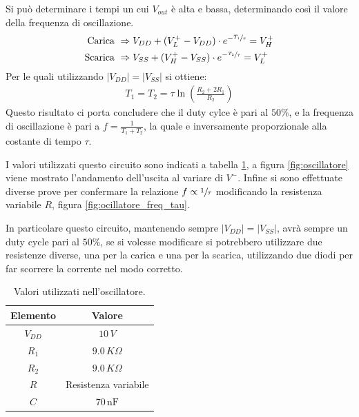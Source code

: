 \documentclass[a4paper,12pt]{article}
\begin{document}
Si può determinare i tempi un cui $V_{out}$ è alta e bassa, determinando così il valore della frequenza di oscillazione.
\begin{align*}
	\text{Carica}\,\,  & \Rightarrow V_{DD} + (V^+_L - V_{DD}) \cdot e^{-\sfrac{T_1}{\tau}} = V^+_H \\
	\text{Scarica}\,\, & \Rightarrow V_{SS} + (V^+_H - V_{SS}) \cdot e^{-\sfrac{T_2}{\tau}} = V^+_L
\end{align*}
Per le quali utilizzando $\left| V_{DD} \right| = \left| V_{SS} \right|$ si ottiene:
\begin{align*}
	T_1 = T_2 = \tau \ln\left( \frac{R_2 + 2R_1}{R_2} \right)
\end{align*}
Questo risultato ci porta concludere che il duty cylce è pari al $50\%$, e la frequenza di oscillazione è pari a $ f = \frac{1}{T_1 + T_2}$, la quale e inversamente proporzionale alla costante di tempo $\tau$.

\noindent I valori utilizzati questo circuito sono indicati a tabella \ref{tab:oscillatore}, a figura \ref{fig:oscillatore} viene mostrato l'andamento dell'uscita al variare di $V^-$. Infine si sono effettuate diverse prove per confermare la relazione $f \propto \sfrac{1}{\tau}$ modificando la resistenza variabile $R$, figura \ref{fig:ocillatore_freq_tau}.

\noindent In particolare questo circuito, mantenendo sempre $\left| V_{DD} \right| = \left| V_{SS} \right|$, avrà sempre un duty cycle pari al $50\%$, se si volesse modificare si potrebbero utilizzare due resistenze diverse, una per la carica e una per la scarica, utilizzando due diodi per far scorrere la corrente nel modo corretto.
\begin{table}[h]
	\centering
	\setlength{\tabcolsep}{20pt}
	\begin{tabular}{c c}
		\toprule
		Elemento & Valore               \\
		\midrule
		$V_{DD}$ & $10\,V$              \\
		$R_1$    & $9.0\,K\Omega$       \\
		$R_2$    & $9.0\,K\Omega$       \\
		$R$      & Resistenza variabile \\
		$C$      & $70\,\mathrm{nF}$    \\
		\bottomrule
	\end{tabular}
	\caption{Valori utilizzati nell'oscillatore.}
	\label{tab:oscillatore}
\end{table}
\end{document}
